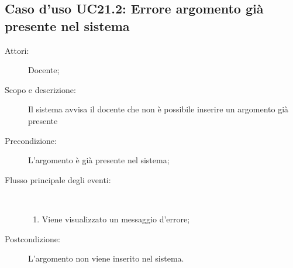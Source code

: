 \subsection{Caso d'uso UC21.2: Errore argomento già presente nel sistema}\begin{description}
\item[Attori:] Docente;
\item[Scopo e descrizione:] Il sistema avvisa il docente che non è possibile inserire un argomento già presente
      \item[Precondizione:] L'argomento è già presente nel sistema;

        \item[Flusso principale degli eventi:] \ 
 \begin{enumerate}
          \item Viene visualizzato un messaggio d'errore;

      \end{enumerate}
    \item[Postcondizione:] L'argomento non viene inserito nel sistema.
  \end{description}
\hypertarget{UC21.3}{}
